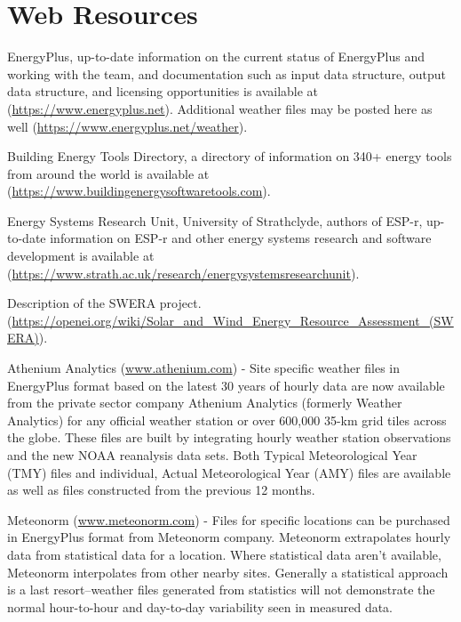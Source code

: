 \section{Web Resources}\label{web-resources}

EnergyPlus, up-to-date information on the current status of EnergyPlus and working with the team, and documentation such as input data structure, output data structure, and licensing opportunities is available at (\url{https://www.energyplus.net}). Additional weather files may be posted here as well (\url{https://www.energyplus.net/weather}).

Building Energy Tools Directory, a directory of information on 340+ energy tools from around the world is available at (\url{https://www.buildingenergysoftwaretools.com}).

Energy Systems Research Unit, University of Strathclyde, authors of ESP-r, up-to-date information on ESP-r and other energy systems research and software development is available at (\url{https://www.strath.ac.uk/research/energysystemsresearchunit}).

Description of the SWERA project. (\url{https://openei.org/wiki/Solar_and_Wind_Energy_Resource_Assessment_(SWERA)}).

Athenium Analytics (\href{https://www.athenium.com/index.php/solutions/}{www.athenium.com}) - Site specific weather files in EnergyPlus format based on the latest 30 years of hourly data are now available from the private sector company Athenium Analytics (formerly Weather Analytics) for any official weather station or over 600,000 35-km grid tiles across the globe. These files are built by integrating hourly weather station observations and the new NOAA reanalysis data sets. Both Typical Meteorological Year (TMY) files and individual, Actual Meteorological Year (AMY) files are available as well as files constructed from the previous 12 months.

Meteonorm (\href{http://www.meteonorm.com}{www.meteonorm.com}) - Files for specific locations can be purchased in EnergyPlus format from Meteonorm company. Meteonorm extrapolates hourly data from statistical data for a location. Where statistical data aren't available, Meteonorm interpolates from other nearby sites. Generally a statistical approach is a last resort--weather files generated from statistics will not demonstrate the normal hour-to-hour and day-to-day variability seen in measured data.
